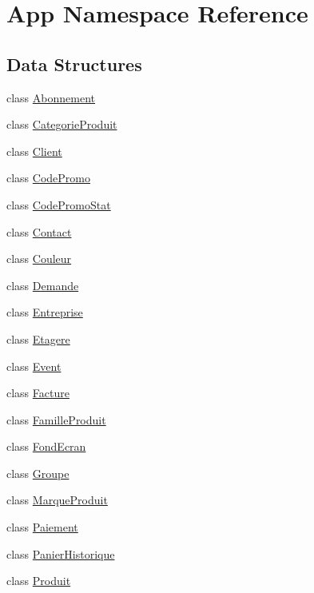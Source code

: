 \hypertarget{namespace_app}{}\section{App Namespace Reference}
\label{namespace_app}
\subsection*{Data Structures}
\begin{DoxyCompactItemize}
\item 
class \mbox{\hyperlink{class_app_1_1_abonnement}{Abonnement}}
\item 
class \mbox{\hyperlink{class_app_1_1_categorie_produit}{Categorie\+Produit}}
\item 
class \mbox{\hyperlink{class_app_1_1_client}{Client}}
\item 
class \mbox{\hyperlink{class_app_1_1_code_promo}{Code\+Promo}}
\item 
class \mbox{\hyperlink{class_app_1_1_code_promo_stat}{Code\+Promo\+Stat}}
\item 
class \mbox{\hyperlink{class_app_1_1_contact}{Contact}}
\item 
class \mbox{\hyperlink{class_app_1_1_couleur}{Couleur}}
\item 
class \mbox{\hyperlink{class_app_1_1_demande}{Demande}}
\item 
class \mbox{\hyperlink{class_app_1_1_entreprise}{Entreprise}}
\item 
class \mbox{\hyperlink{class_app_1_1_etagere}{Etagere}}
\item 
class \mbox{\hyperlink{class_app_1_1_event}{Event}}
\item 
class \mbox{\hyperlink{class_app_1_1_facture}{Facture}}
\item 
class \mbox{\hyperlink{class_app_1_1_famille_produit}{Famille\+Produit}}
\item 
class \mbox{\hyperlink{class_app_1_1_fond_ecran}{Fond\+Ecran}}
\item 
class \mbox{\hyperlink{class_app_1_1_groupe}{Groupe}}
\item 
class \mbox{\hyperlink{class_app_1_1_marque_produit}{Marque\+Produit}}
\item 
class \mbox{\hyperlink{class_app_1_1_paiement}{Paiement}}
\item 
class \mbox{\hyperlink{class_app_1_1_panier_historique}{Panier\+Historique}}
\item 
class \mbox{\hyperlink{class_app_1_1_produit}{Produit}}
\item 

\end{DoxyCompactItemize}
